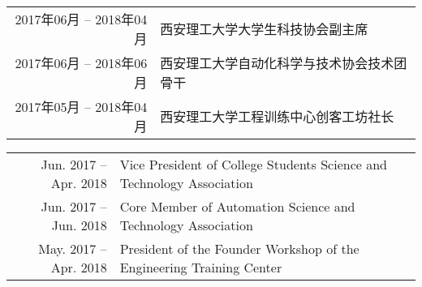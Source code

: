 \ifzh
{}
\begin{table}[!htbp]
    \begin{tabular}{rl}
        2017年06月 -- 2018年04月 & 西安理工大学大学生科技协会副主席           \\
        2017年06月 -- 2018年06月 & 西安理工大学自动化科学与技术协会技术团骨干 \\
        2017年05月 -- 2018年04月 & 西安理工大学工程训练中心创客工坊社长       \\
    \end{tabular}
\end{table}
\else
{}
\begin{table}[!htbp]
    \begin{tabular}{rl}
        Jun. 2017 -- Apr. 2018 & Vice President of College Students Science and Technology Association \\
        Jun. 2017 -- Jun. 2018 & Core Member of Automation Science and Technology Association \\
        May. 2017 -- Apr. 2018 & President of the Founder Workshop of the Engineering Training Center \\
    \end{tabular}
\end{table}
\fi